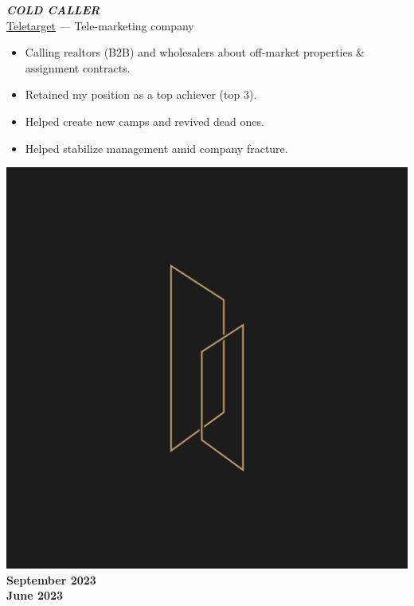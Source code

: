 \documentclass[10pt]{article}
\newcommand{\fancy}[1]{\Large\textbf{\textit{#1}}}
\begin{document}
\vspace{3em}

\noindent
\begin{minipage}{0.7\textwidth}
 \fancy{COLD CALLER} \\
	{\large \href{https://www.linkedin.com/company/tele-target}{Teletarget} --- Tele-marketing company} \\
\begin{itemize}
	\item Calling realtors (B2B) and wholesalers about off-market properties \& assignment contracts.
    \item Retained my position as a top achiever (top 3).
    \item Helped create new camps and revived dead ones.
    \item Helped stabilize management amid company fracture.
\end{itemize}   
\end{minipage}
\hspace{35pt}
\begin{minipage}{0.2\textwidth}
\begin{center}
\vspace{10pt}
\includegraphics[width=\textwidth]{tt_coldcalling.jpg} \\
    \large\textbf{September 2023\\June 2023} %
\end{center}
\end{minipage} %
\end{document}
